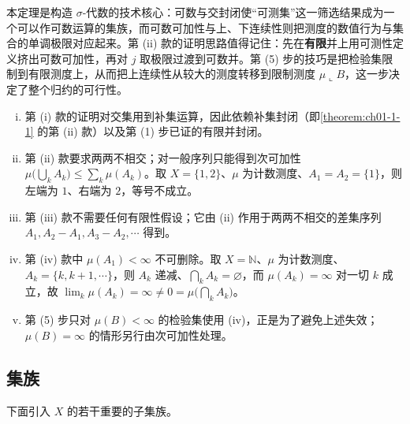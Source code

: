 \documentclass[../../main.tex]{subfiles}
\begin{document}
\begin{remark}\label{remark:ch01-thm-1-2-动机}
本定理是构造 $\sigma$-代数的技术核心：可数与交封闭使“可测集”这一筛选结果成为一个可以作可数运算的集族，而可数可加性与上、下连续性则把测度的数值行为与集合的单调极限对应起来。第 (ii) 款的证明思路值得记住：先在\textbf{有限}并上用可测性定义挤出可数可加性，再对 $j$ 取极限过渡到可数并。第 (5) 步的技巧是把检验集限制到有限测度上，从而把上连续性从较大的测度转移到限制测度 $\mu\llcorner B$，这一步决定了整个归约的可行性。
\end{remark}

\begin{remark}\label{remark:ch01-thm-1-2-条件}
\begin{enumerate}[(i)]
\item 第 (i) 款的证明对交集用到补集运算，因此依赖补集封闭（即\cref{theorem:ch01-1-1} 的第 (ii) 款）以及第 (1) 步已证的有限并封闭。%
\item 第 (ii) 款要求两两不相交；对一般序列只能得到次可加性 $\mu\bigl(\bigcup_{k}A_{k}\bigr)\leqslant\sum_{k}\mu(A_{k})$。取 $X=\{1,2\}$、$\mu$ 为计数测度、$A_{1}=A_{2}=\{1\}$，则左端为 $1$、右端为 $2$，等号不成立。
\item 第 (iii) 款不需要任何有限性假设；它由 (ii) 作用于两两不相交的差集序列 $A_{1},A_{2}-A_{1},A_{3}-A_{2},\cdots$ 得到。
\item 第 (iv) 款中 $\mu(A_{1})<\infty$ 不可删除。取 $X=\mathbb{N}$、$\mu$ 为计数测度、$A_{k}=\{k,k+1,\cdots\}$，则 $A_{k}$ 递减、$\bigcap_{k}A_{k}=\varnothing$，而 $\mu(A_{k})=\infty$ 对一切 $k$ 成立，故 $\lim_{k}\mu(A_{k})=\infty\neq0=\mu\bigl(\bigcap_{k}A_{k}\bigr)$。
\item 第 (5) 步只对 $\mu(B)<\infty$ 的检验集使用 (iv)，正是为了避免上述失效；$\mu(B)=\infty$ 的情形另行由次可加性处理。
\end{enumerate}
\end{remark}

\subsection{集族}\label{subsection:ch01-01-集族}

下面引入 $X$ 的若干重要的子集族。
\end{document}
